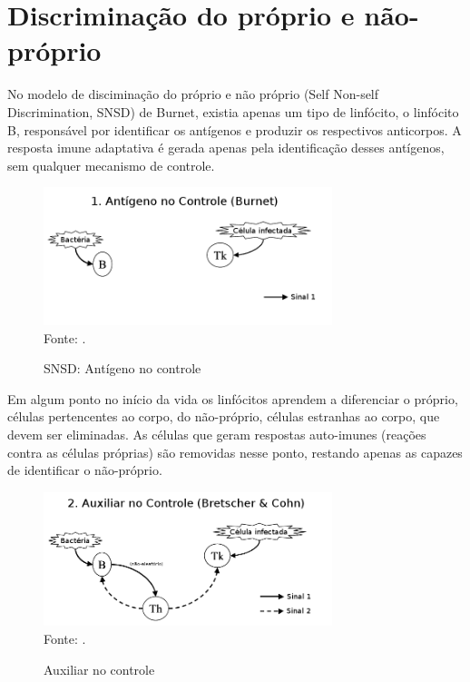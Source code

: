 \section{Discriminação do próprio e não-próprio}

No modelo de disciminação do próprio e não próprio (Self Non-self Discrimination, SNSD) de Burnet, existia apenas um tipo de linfócito, o linfócito B, responsável por identificar os antígenos e produzir os respectivos anticorpos. A resposta imune adaptativa é gerada apenas pela identificação desses antígenos, sem qualquer mecanismo de controle.

\begin{figure}[h!]
    \vspace{0.5cm}
    \centering
    \caption{SNSD: Antígeno no controle}
    \label{fig:nis_antigen}
    \label{fig:signals_first}
    \vspace{0.5cm}
    \includegraphics[width=0.75\textwidth]{img/signals1-antigen_br.png}
    \vspace{0.5cm}
    \\ Fonte: \citet{Aickelin2002}.
    \vspace{0.5cm}
\end{figure}


Em algum ponto no início da vida os linfócitos aprendem a diferenciar o próprio, células pertencentes ao corpo, do não-próprio, células estranhas ao corpo, que devem ser eliminadas. As células que geram respostas auto-imunes (reações contra as células próprias) são removidas nesse ponto, restando apenas as capazes de identificar o não-próprio.

\begin{figure}[h!]
    \vspace{0.5cm}
    \centering
    \caption{Auxiliar no controle}
    \label{fig:nis_helper}
    \vspace{0.5cm}
    \includegraphics[width=0.75\textwidth]{img/signals2-helper_br.png}
    \vspace{0.5cm}
    \\ Fonte: \citet{Aickelin2002}.
    \vspace{0.5cm}
\end{figure}

